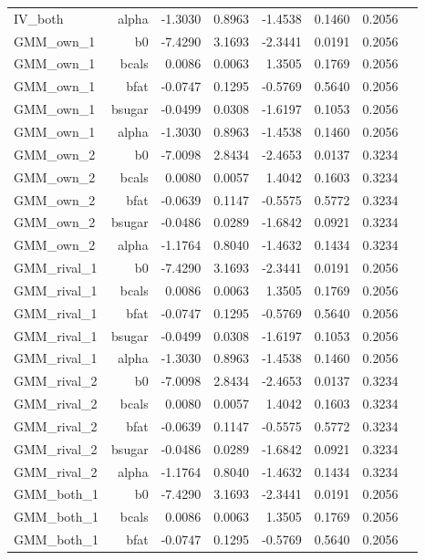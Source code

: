 \begin{longtable}{@{}lrrrrrrr@{}}
IV\_both & alpha & -1.3030 & 0.8963 & -1.4538 & 0.1460 & 0.2056 &  \\
GMM\_own\_1 & b0 & -7.4290 & 3.1693 & -2.3441 & 0.0191 & 0.2056 &  \\
GMM\_own\_1 & bcals & 0.0086 & 0.0063 & 1.3505 & 0.1769 & 0.2056 &  \\
GMM\_own\_1 & bfat & -0.0747 & 0.1295 & -0.5769 & 0.5640 & 0.2056 &  \\
GMM\_own\_1 & bsugar & -0.0499 & 0.0308 & -1.6197 & 0.1053 & 0.2056 &  \\
GMM\_own\_1 & alpha & -1.3030 & 0.8963 & -1.4538 & 0.1460 & 0.2056 &  \\
GMM\_own\_2 & b0 & -7.0098 & 2.8434 & -2.4653 & 0.0137 & 0.3234 &  \\
GMM\_own\_2 & bcals & 0.0080 & 0.0057 & 1.4042 & 0.1603 & 0.3234 &  \\
GMM\_own\_2 & bfat & -0.0639 & 0.1147 & -0.5575 & 0.5772 & 0.3234 &  \\
GMM\_own\_2 & bsugar & -0.0486 & 0.0289 & -1.6842 & 0.0921 & 0.3234 &  \\
GMM\_own\_2 & alpha & -1.1764 & 0.8040 & -1.4632 & 0.1434 & 0.3234 &  \\
GMM\_rival\_1 & b0 & -7.4290 & 3.1693 & -2.3441 & 0.0191 & 0.2056 &  \\
GMM\_rival\_1 & bcals & 0.0086 & 0.0063 & 1.3505 & 0.1769 & 0.2056 &  \\
GMM\_rival\_1 & bfat & -0.0747 & 0.1295 & -0.5769 & 0.5640 & 0.2056 &  \\
GMM\_rival\_1 & bsugar & -0.0499 & 0.0308 & -1.6197 & 0.1053 & 0.2056 &  \\
GMM\_rival\_1 & alpha & -1.3030 & 0.8963 & -1.4538 & 0.1460 & 0.2056 &  \\
GMM\_rival\_2 & b0 & -7.0098 & 2.8434 & -2.4653 & 0.0137 & 0.3234 &  \\
GMM\_rival\_2 & bcals & 0.0080 & 0.0057 & 1.4042 & 0.1603 & 0.3234 &  \\
GMM\_rival\_2 & bfat & -0.0639 & 0.1147 & -0.5575 & 0.5772 & 0.3234 &  \\
GMM\_rival\_2 & bsugar & -0.0486 & 0.0289 & -1.6842 & 0.0921 & 0.3234 &  \\
GMM\_rival\_2 & alpha & -1.1764 & 0.8040 & -1.4632 & 0.1434 & 0.3234 &  \\
GMM\_both\_1 & b0 & -7.4290 & 3.1693 & -2.3441 & 0.0191 & 0.2056 &  \\
GMM\_both\_1 & bcals & 0.0086 & 0.0063 & 1.3505 & 0.1769 & 0.2056 &  \\
GMM\_both\_1 & bfat & -0.0747 & 0.1295 & -0.5769 & 0.5640 & 0.2056 &  \\

\end{longtable}
